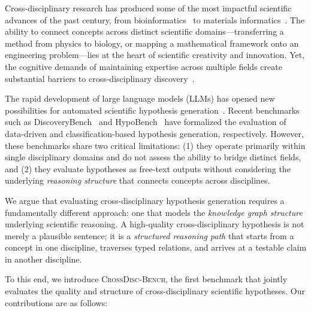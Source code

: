 \documentclass{article}
\newcommand{\ours}{\textsc{CrossDisc-Bench}}
\begin{document}
Cross-disciplinary research has produced some of the most impactful scientific advances of the past century, from bioinformatics~\cite{lander2001initial} to materials informatics~\cite{agrawal2016perspective}.
The ability to connect concepts across distinct scientific domains---transferring a method from physics to biology, or mapping a mathematical framework onto an engineering problem---lies at the heart of scientific creativity and innovation.
Yet, the cognitive demands of maintaining expertise across multiple fields create substantial barriers to cross-disciplinary discovery~\cite{foster2015tradition}.

The rapid development of large language models (LLMs) has opened new possibilities for automated scientific hypothesis generation~\cite{wang2023scimon,yang2024leandojo}.
Recent benchmarks such as DiscoveryBench~\cite{majumder2024discoverybench} and HypoBench~\cite{liu2025hypobench} have formalized the evaluation of data-driven and classification-based hypothesis generation, respectively.
However, these benchmarks share two critical limitations: (1) they operate primarily within single disciplinary domains and do not assess the ability to bridge distinct fields, and (2) they evaluate hypotheses as free-text outputs without considering the underlying \emph{reasoning structure} that connects concepts across disciplines.

We argue that evaluating cross-disciplinary hypothesis generation requires a fundamentally different approach: one that models the \emph{knowledge graph structure} underlying scientific reasoning.
A high-quality cross-disciplinary hypothesis is not merely a plausible sentence; it is a \emph{structured reasoning path} that starts from a concept in one discipline, traverses typed relations, and arrives at a testable claim in another discipline.

To this end, we introduce \ours{}, the first benchmark that jointly evaluates the quality and structure of cross-disciplinary scientific hypotheses.
Our contributions are as follows:
\end{document}
